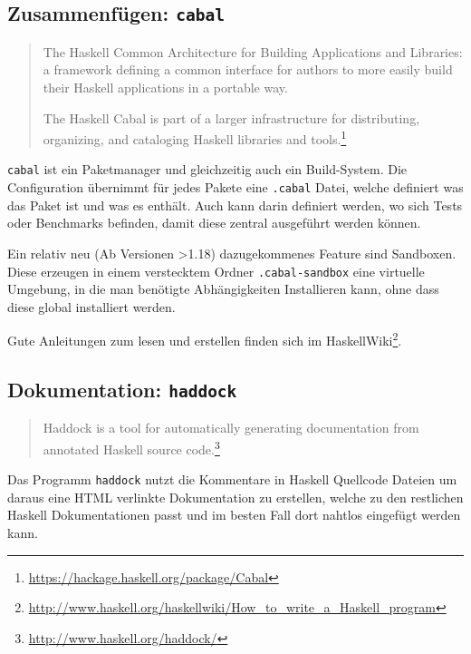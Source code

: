 \subsection{Zusammenfügen: \texttt{cabal}}
\begin{quote}
  The Haskell Common Architecture for Building Applications and Libraries: a
  framework defining a common interface for authors to more easily build their
  Haskell applications in a portable way.

  The Haskell Cabal is part of a larger infrastructure for distributing,
  organizing, and cataloging Haskell libraries and
  tools.\footnote{\url{https://hackage.haskell.org/package/Cabal}}
\end{quote}
\texttt{cabal} ist ein Paketmanager und gleichzeitig auch ein Build-System. Die
Configuration übernimmt für jedes Pakete eine \texttt{.cabal} Datei, welche
definiert was das Paket ist und was es enthält. Auch kann darin definiert
werden, wo sich Tests oder Benchmarks befinden, damit diese zentral ausgeführt
werden können.

Ein relativ neu (Ab Versionen >1.18) dazugekommenes Feature sind Sandboxen.
Diese erzeugen in einem verstecktem Ordner \texttt{.cabal-sandbox} eine
virtuelle Umgebung, in die man benötigte Abhängigkeiten Installieren kann, ohne
dass diese global installiert werden.

Gute Anleitungen zum lesen und erstellen finden sich im
HaskellWiki\footnote{\url{http://www.haskell.org/haskellwiki/How_to_write_a_Haskell_program}}.

\subsection{Dokumentation: \texttt{haddock}}
\begin{quote}
  Haddock is a tool for automatically generating documentation from annotated
  Haskell source code.\footnote{\url{http://www.haskell.org/haddock/}}
\end{quote}
Das Programm \texttt{haddock} nutzt die Kommentare in Haskell Quellcode Dateien
um daraus eine HTML verlinkte Dokumentation zu erstellen, welche zu den
restlichen Haskell Dokumentationen passt und im besten Fall dort nahtlos
eingefügt werden kann.

